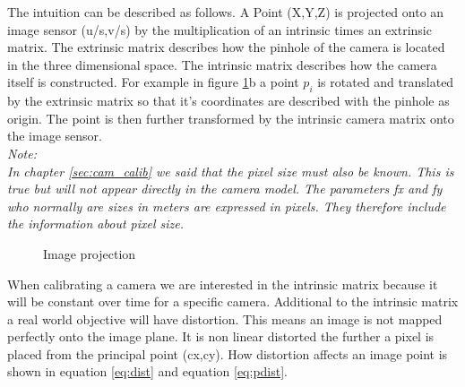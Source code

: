 \documentclass[11pt,a4paper,titlepage,oneside]{report}
\begin{document}
The intuition can be described as follows. A Point (X,Y,Z) is projected onto an image sensor (u/s,v/s) by the multiplication of an intrinsic times an extrinsic matrix. The extrinsic matrix describes how the pinhole of the camera is located in the three dimensional space. The intrinsic matrix describes how the camera itself is constructed. For example in figure \ref{fig:projection}b a point $p_i$ is rotated and translated by the extrinsic matrix so that it's coordinates are described with the pinhole as origin. The point is then further transformed by the intrinsic camera matrix onto the image sensor.\\
\em
Note:\\
In chapter \ref{sec:cam_calib} we said that the pixel size must also be known. This is true but will not appear directly in the camera model. The parameters fx and fy who normally are sizes in meters are expressed in pixels. They therefore include the information about pixel size.
\normalfont

\begin{figure}[H]
	\centering
	\caption{Image projection}\label{fig:projection}
\end{figure}

When calibrating a camera we are interested in the intrinsic matrix because it will be constant over time for a specific camera. Additional to the intrinsic matrix a real world objective will have distortion. This means an image is not mapped perfectly onto the image plane. It is non linear distorted the further a pixel is placed from the principal point (cx,cy). How distortion affects an image point is shown in equation \ref{eq:dist} and equation \ref{eq:pdist}.
\end{document}
